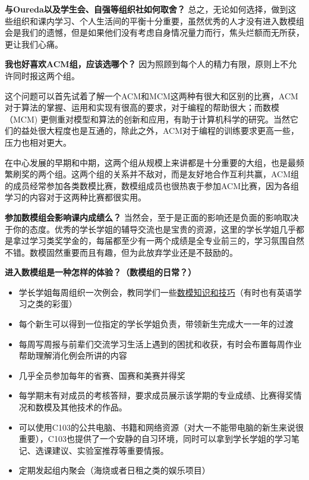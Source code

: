 \documentclass[presentation]{beamer}
\begin{document}
\begin{CJK*}{UTF8}{gbsn}
\begin{frame}
\begin{exampleblock}{\textbf{与Oureda以及学生会、自强等组织社如何取舍？}}
    总之，无论如何选择，做到这些组织和课内学习、个人生活间的平衡十分重要，虽然优秀的人才没有进入数模组会是我们的遗憾，但是如果他们没有考虑自身情况量力而行，焦头烂额而无所获，更让我们心痛。
    \end{exampleblock}
\end{frame}

\begin{frame}
\begin{alertblock}{\textbf{我也好喜欢ACM组，应该选哪个？}}
因为照顾到每个人的精力有限，原则上不允许同时报这两个组。

这个问题可以首先试着了解一个ACM和MCM这两种有很大和区别的比赛，ACM对于算法的掌握、运用和实现有很高的要求，对于编程的帮助很大；而数模（MCM) 更侧重对模型和算法的创新和应用，有助于计算机科学的研究。当然它们的益处很大程度也是互通的，除此之外，ACM对于编程的训练要求更高一些，压力也相对更大。

在中心发展的早期和中期，这两个组从规模上来讲都是十分重要的大组，也是最频繁刷奖的两个组。这两个组的关系并不敌对，而是友好地合作互利共赢，ACM组的成员经常参加各类数模比赛，数模组成员也很热衷于参加ACM比赛，因为各组学习的内容对于这两种比赛都很实用。
\end{alertblock}

\begin{block}{\textbf{参加数模组会影响课内成绩么？}}
当然会，至于是正面的影响还是负面的影响取决于你的态度。优秀的学长学姐的辅导交流也是宝贵的资源，这里的学长学姐几乎都是拿过学习类奖学金的，每届都至少有一两个成绩是全专业前三的，学习氛围自然不错。数模固然重要而且有趣，但为此放弃学业还是不鼓励的。
\end{block}
\end{frame}

\begin{frame}
\begin{block}{\textbf{进入数模组是一种怎样的体验？（数模组的日常？）}}
\begin{itemize}
   \item 学长学姐每周组织一次例会，教同学们一些\hyperlink{content}{数模知识和技巧}（有时也有英语学习之类的彩蛋）
   \item 每个新生可以得到一位指定的学长学姐负责，带领新生完成大一一年的过渡
   \item 每周写周报与前辈们交流学习生活上遇到的困扰和收获，有时会布置每周作业帮助理解消化例会所讲的内容
   \item 几乎全员参加每年的省赛、国赛和美赛并得奖
   \item 每学期末有对成员的考核答辩，要求成员展示该学期的专业成绩、比赛得奖情况和数模及其他技术的作品。
   \item 可以使用C103的公共电脑、书籍和网络资源（对大一不能带电脑的新生来说很重要），C103也提供了一个安静的自习环境，同时可以拿到学长学姐的学习笔记、选课建议、实验室推荐等重要情报。
   \item 定期发起组内聚会（海烧或者日租之类的娱乐项目）
\end{itemize}
\end{block}
\end{frame}


\end{CJK*}
\end{document}
